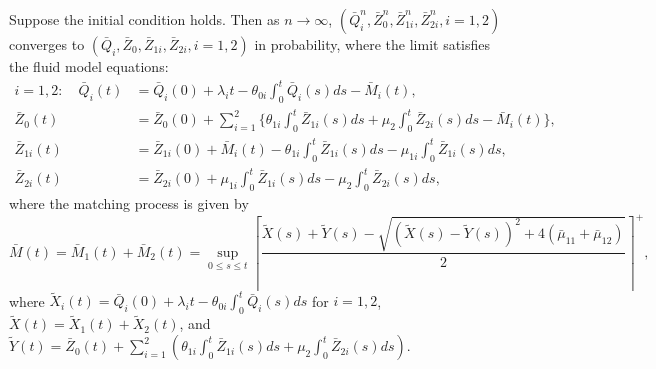 \begin{theorem} \label{thm:EC1}
Suppose the initial condition holds. Then as $n \to \infty$, $(\bar{Q}^n_i, \bar{Z}^n_0, \bar{Z}^n_{1i}, \bar{Z}^n_{2i}, i=1,2)$ 
converges to $(\bar{Q}_i, \bar{Z}_0, \bar{Z}_{1i}, \bar{Z}_{2i}, i=1,2)$ in probability, where the limit satisfies 
the fluid model equations:
\begin{align*}
i = 1,2: \quad
\bar{Q}_i(t) &= \bar{Q}_i(0) + \lambda_i t - \theta_{0i} \int_0^t \bar{Q}_i(s)ds - \bar{M}_i(t), \\
\bar{Z}_0(t) &= \bar{Z}_0(0) + \sum_{i=1}^{2} \{\theta_{1i} \int_0^t \bar{Z}_{1i}(s)ds + \mu_2 \int_0^t \bar{Z}_{2i}(s)ds - \bar{M}_i(t)\}, \\
\bar{Z}_{1i}(t) &= \bar{Z}_{1i}(0) + \bar{M}_i(t) - \theta_{1i} \int_0^t \bar{Z}_{1i}(s)ds - \mu_{1i} \int_0^t \bar{Z}_{1i}(s)ds, \\
\bar{Z}_{2i}(t) &= \bar{Z}_{2i}(0) + \mu_{1i} \int_0^t \bar{Z}_{1i}(s)ds - \mu_2 \int_0^t \bar{Z}_{2i}(s)ds,
\end{align*}
where the matching process is given by
\begin{equation*}
\bar{M}(t) = \bar{M}_1(t) + \bar{M}_2(t) = \sup_{0 \le s \le t} \left\lceil\frac{\tilde{X}(s) + \tilde{Y}(s) - \sqrt{(\tilde{X}(s) - \tilde{Y}(s))^2 + 4(\bar{\mu}_{11}+\bar{\mu}_{12})}}{2}\right\rceil^+,
\end{equation*}
where $\tilde{X}_i(t) = \bar{Q}_i(0) + \lambda_i t - \theta_{0i} \int_0^t \bar{Q}_i(s)ds$ for $i=1,2$, $\tilde{X}(t) = \tilde{X}_1(t) + \tilde{X}_2(t)$, and
$\tilde{Y}(t) = \bar{Z}_0(t) + \sum_{i=1}^{2}(\theta_{1i} \int_0^t \bar{Z}_{1i}(s)ds + \mu_2 \int_0^t \bar{Z}_{2i}(s)ds)$.
\end{theorem}

